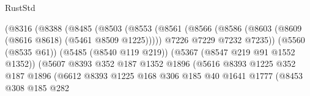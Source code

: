 \begin{lexlean}{RustStd}
\begin{coremodule}
                                        (@8316
                                          (@8388
                                            (@8485
                                              (@8503
                                                (@8553
                                                  (@8561
                                                    (@8566
                                                      (@8586
                                                        (@8603
                                                          (@8609
                                                            (@8616 @8618)
                                                            (@5461 @8509 @1225)))))
                                                    @7226
                                                    @7229
                                                    @7232
                                                    @7235))
                                                (@5560 (@8535 @61))
                                                (@5485 (@8540 @119 @219))
                                                (@5367 (@8547 @219 @91 @1552 @1352))
                                                (@5607
                                                  @8393
                                                  @352
                                                  @187
                                                  @1352
                                                  @1896
                                                  (@5616
                                                    @8393
                                                    @1225
                                                    @352
                                                    @187
                                                    @1896
                                                    (@6612
                                                      @8393
                                                      @1225
                                                      @168
                                                      @306
                                                      @185
                                                      @40
                                                      @1641
                                                      @1777
                                                      (@8453
                                                        @308
                                                        @185
                                                        @282

\end{coremodule}
\end{lexlean}
